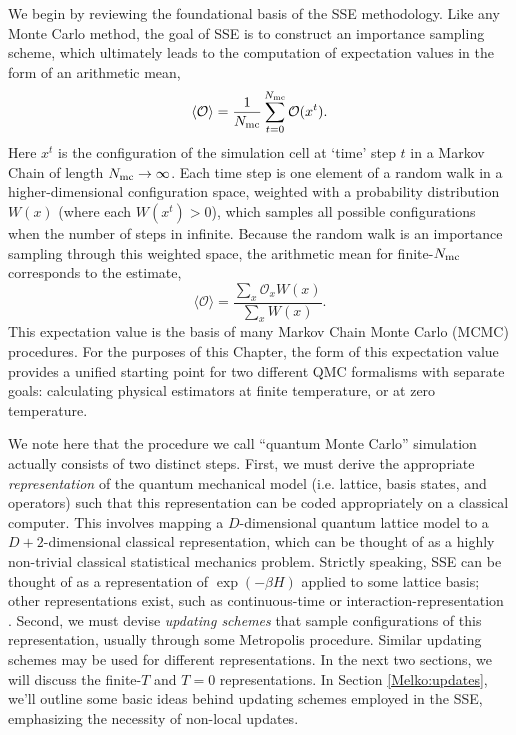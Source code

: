 \documentclass[vecphys]{svmult}
\begin{document}
We begin by reviewing the foundational basis of the SSE methodology.  Like any Monte Carlo method, the goal of SSE is to construct an importance sampling scheme, which ultimately leads to the computation of expectation values in the form of an arithmetic mean,
\begin{equation}
\langle \mathcal{O} \rangle  = \frac{1}{N_{\rm mc}} \sum_{t=0}^{N_{\rm mc}} \mathcal{O}(x^t). \label{est1}
\end{equation}
Here $x^t$ is the configuration of the simulation cell at \lq time' step $t$ in a Markov Chain of length $N_{\rm mc} \rightarrow \infty$.
Each time step is one element of a random walk in a higher-dimensional configuration space, weighted with a probability distribution $W(x)$ (where each $W(x^t) > 0$), which samples all possible configurations when the number of steps in infinite.
Because the random walk is an importance sampling through this weighted space, the arithmetic mean for finite-$N_{\rm mc}$ corresponds to the estimate,
\begin{equation}
\langle \mathcal{O} \rangle  = \frac{\sum_x \mathcal{O}_x  W(x)}{\sum_x W(x)}. \label{est2}
\end{equation}
This expectation value is the basis of many Markov Chain Monte Carlo (MCMC) procedures.
For the purposes of this Chapter, the form of this expectation value provides a unified starting point
for two different QMC formalisms with separate goals: calculating physical estimators at finite temperature, or at zero temperature.  

We note here that the procedure we call ``quantum Monte Carlo'' simulation actually consists of two distinct steps.  First, we must derive the appropriate {\it representation} of the quantum mechanical model (i.e. lattice, basis states, and operators) such that this representation can be coded appropriately on a classical computer.
This involves mapping a $D$-dimensional quantum lattice model to a $D+2$-dimensional classical representation, which can be thought of as a highly non-trivial classical statistical mechanics problem.
Strictly speaking, SSE can be thought of as a representation of $\exp(-\beta H)$ applied to some lattice basis; other representations exist, such as continuous-time or interaction-representation \cite{Melko:Assaad07}.
Second, we must devise {\it updating schemes} that sample configurations of this representation, usually through some Metropolis procedure.  Similar updating schemes may be used for different representations.
In the next two sections, we will discuss the finite-$T$ and $T=0$ representations.  In Section \ref{Melko:updates}, we'll outline some basic ideas behind updating schemes employed in the SSE, emphasizing the necessity of non-local updates.  
\end{document}
